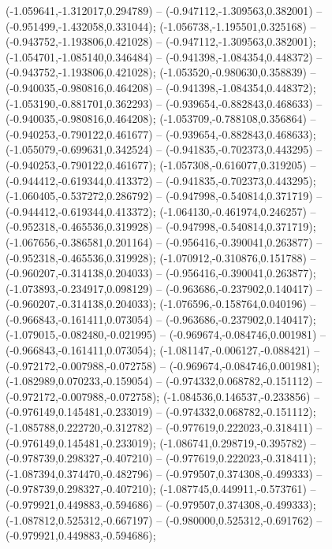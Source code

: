  (-1.059641,-1.312017,0.294789) -- (-0.947112,-1.309563,0.382001) -- (-0.951499,-1.432058,0.331044);
 (-1.056738,-1.195501,0.325168) -- (-0.943752,-1.193806,0.421028) -- (-0.947112,-1.309563,0.382001);
 (-1.054701,-1.085140,0.346484) -- (-0.941398,-1.084354,0.448372) -- (-0.943752,-1.193806,0.421028);
 (-1.053520,-0.980630,0.358839) -- (-0.940035,-0.980816,0.464208) -- (-0.941398,-1.084354,0.448372);
 (-1.053190,-0.881701,0.362293) -- (-0.939654,-0.882843,0.468633) -- (-0.940035,-0.980816,0.464208);
 (-1.053709,-0.788108,0.356864) -- (-0.940253,-0.790122,0.461677) -- (-0.939654,-0.882843,0.468633);
 (-1.055079,-0.699631,0.342524) -- (-0.941835,-0.702373,0.443295) -- (-0.940253,-0.790122,0.461677);
 (-1.057308,-0.616077,0.319205) -- (-0.944412,-0.619344,0.413372) -- (-0.941835,-0.702373,0.443295);
 (-1.060405,-0.537272,0.286792) -- (-0.947998,-0.540814,0.371719) -- (-0.944412,-0.619344,0.413372);
 (-1.064130,-0.461974,0.246257) -- (-0.952318,-0.465536,0.319928) -- (-0.947998,-0.540814,0.371719);
 (-1.067656,-0.386581,0.201164) -- (-0.956416,-0.390041,0.263877) -- (-0.952318,-0.465536,0.319928);
 (-1.070912,-0.310876,0.151788) -- (-0.960207,-0.314138,0.204033) -- (-0.956416,-0.390041,0.263877);
 (-1.073893,-0.234917,0.098129) -- (-0.963686,-0.237902,0.140417) -- (-0.960207,-0.314138,0.204033);
 (-1.076596,-0.158764,0.040196) -- (-0.966843,-0.161411,0.073054) -- (-0.963686,-0.237902,0.140417);
 (-1.079015,-0.082480,-0.021995) -- (-0.969674,-0.084746,0.001981) -- (-0.966843,-0.161411,0.073054);
 (-1.081147,-0.006127,-0.088421) -- (-0.972172,-0.007988,-0.072758) -- (-0.969674,-0.084746,0.001981);
 (-1.082989,0.070233,-0.159054) -- (-0.974332,0.068782,-0.151112) -- (-0.972172,-0.007988,-0.072758);
 (-1.084536,0.146537,-0.233856) -- (-0.976149,0.145481,-0.233019) -- (-0.974332,0.068782,-0.151112);
 (-1.085788,0.222720,-0.312782) -- (-0.977619,0.222023,-0.318411) -- (-0.976149,0.145481,-0.233019);
 (-1.086741,0.298719,-0.395782) -- (-0.978739,0.298327,-0.407210) -- (-0.977619,0.222023,-0.318411);
 (-1.087394,0.374470,-0.482796) -- (-0.979507,0.374308,-0.499333) -- (-0.978739,0.298327,-0.407210);
 (-1.087745,0.449911,-0.573761) -- (-0.979921,0.449883,-0.594686) -- (-0.979507,0.374308,-0.499333);
 (-1.087812,0.525312,-0.667197) -- (-0.980000,0.525312,-0.691762) -- (-0.979921,0.449883,-0.594686);
